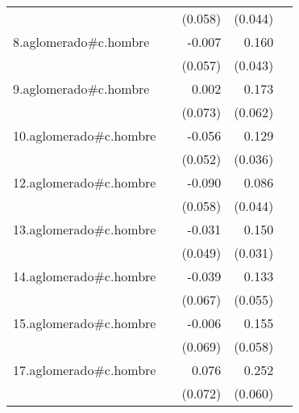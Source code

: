 {\begin{longtable}{l*{4}{D{.}{.}{-1}}}
            &                     &     (0.058)         &     (0.044)         &                     \\
\addlinespace
8.aglomerado#c.hombre&                     &      -0.007         &       0.160\sym{***}&                     \\
            &                     &     (0.057)         &     (0.043)         &                     \\
\addlinespace
9.aglomerado#c.hombre&                     &       0.002         &       0.173\sym{**} &                     \\
            &                     &     (0.073)         &     (0.062)         &                     \\
\addlinespace
10.aglomerado#c.hombre&                     &      -0.056         &       0.129\sym{***}&                     \\
            &                     &     (0.052)         &     (0.036)         &                     \\
\addlinespace
12.aglomerado#c.hombre&                     &      -0.090         &       0.086         &                     \\
            &                     &     (0.058)         &     (0.044)         &                     \\
\addlinespace
13.aglomerado#c.hombre&                     &      -0.031         &       0.150\sym{***}&                     \\
            &                     &     (0.049)         &     (0.031)         &                     \\
\addlinespace
14.aglomerado#c.hombre&                     &      -0.039         &       0.133\sym{*}  &                     \\
            &                     &     (0.067)         &     (0.055)         &                     \\
\addlinespace
15.aglomerado#c.hombre&                     &      -0.006         &       0.155\sym{**} &                     \\
            &                     &     (0.069)         &     (0.058)         &                     \\
\addlinespace
17.aglomerado#c.hombre&                     &       0.076         &       0.252\sym{***}&                     \\
            &                     &     (0.072)         &     (0.060)         &                     \\

\end{longtable}}
